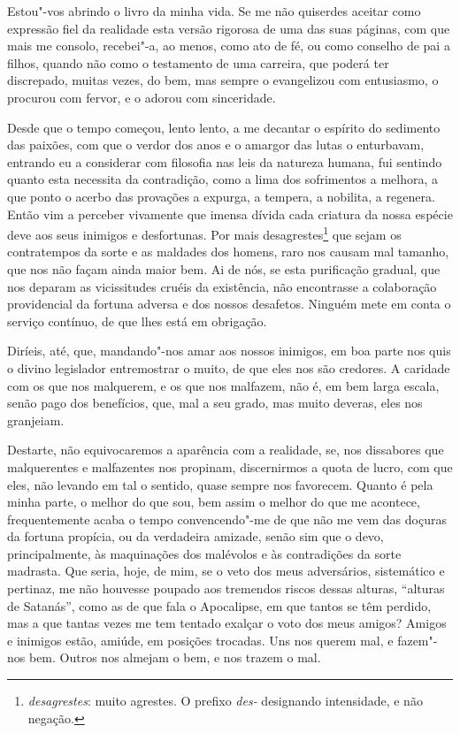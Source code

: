 Estou"-vos abrindo o livro da minha vida. Se me não quiserdes
aceitar como expressão fiel da realidade esta versão rigorosa de uma
das suas páginas, com que mais me consolo, recebei"-a, ao menos, como
ato de fé, ou como conselho de pai a filhos, quando não como o
testamento de uma carreira, que poderá ter discrepado, muitas vezes, do
bem, mas sempre o evangelizou com entusiasmo, o procurou com fervor, e
o adorou com sinceridade.

Desde que o tempo começou, lento lento, a me decantar o espírito
do sedimento das paixões, com que o verdor dos anos e o amargor das
lutas o enturbavam, entrando eu a considerar com filosofia nas leis da
natureza humana, fui sentindo quanto esta necessita da contradição,
como a lima dos sofrimentos a melhora, a que ponto o acerbo das
provações a expurga, a tempera, a nobilita, a regenera. Então vim a
perceber vivamente que imensa dívida cada criatura da nossa espécie
deve aos seus inimigos e desfortunas. Por mais desagrestes\footnote{
\textit{desagrestes}: muito agrestes.  O prefixo \textit{des-} designando intensidade, e não negação.} que sejam os
contratempos da sorte e as maldades dos homens, raro nos causam mal
tamanho, que nos não façam ainda maior bem. Ai de nós, se esta
purificação gradual, que nos deparam as vicissitudes cruéis da
existência, não encontrasse a colaboração providencial da
fortuna adversa e
dos nossos desafetos. Ninguém mete em conta o serviço contínuo, de que
lhes está em obrigação.

Diríeis, até, que, mandando"-nos amar aos nossos inimigos, em boa
parte nos quis o divino legislador entremostrar o muito, de que eles
nos são credores. A caridade com os que nos malquerem, e os que nos
malfazem, não é, em bem larga escala, senão pago dos benefícios, que,
mal a seu grado, mas muito deveras, eles nos granjeiam.

Destarte, não equivocaremos a aparência com a realidade, se, nos
dissabores que malquerentes e malfazentes nos propinam, discernirmos a
quota de lucro, com que eles, não levando em tal o sentido, quase
sempre nos favorecem. Quanto é pela minha parte, o melhor do que sou,
bem assim o melhor do que me acontece, frequentemente acaba o tempo
convencendo"-me de que não me vem das doçuras da fortuna propícia, ou da
verdadeira amizade, senão sim que o devo, principalmente, às
maquinações dos malévolos e às contradições da sorte madrasta. Que
seria, hoje, de mim, se o veto dos meus adversários, sistemático e
pertinaz, me não houvesse poupado aos tremendos riscos dessas alturas,
``alturas de Satanás'', como as de que fala o
Apocalipse, em que tantos se têm perdido,
mas a que tantas vezes me tem tentado exalçar o voto dos meus amigos?
Amigos e inimigos estão, amiúde, em posições trocadas. Uns nos querem
mal, e fazem"-nos bem. Outros nos almejam o bem, e nos trazem o mal.

